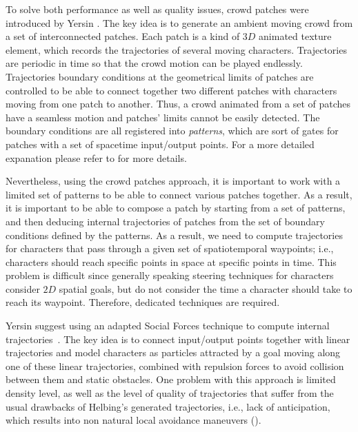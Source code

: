 To solve both performance as well as quality issues, crowd patches were introduced by Yersin \etal \cite{Yersin:2009}.
The key idea is to generate an ambient moving crowd from a set of interconnected patches.
Each patch is a kind of $3D$ animated texture element, which records the trajectories of several moving characters.
Trajectories are periodic in time so that the crowd motion can be played endlessly.
Trajectories boundary conditions at the geometrical limits of patches are controlled to be able to connect together two different patches with characters moving from one patch to another.
Thus, a crowd animated from a set of patches have a seamless motion and patches' limits cannot be easily detected.
The boundary conditions are all registered into {\it patterns}, which are sort of gates for patches with a set of spacetime input/output points.
For a more detailed expanation please refer to \cite{Yersin:2009} for more details. 

Nevertheless, using the crowd patches approach, it is important to work with a limited set of patterns to be able to connect various patches together.
As a result, it is important to be able to compose a patch by starting from a set of patterns, and then deducing internal trajectories of patches from the set of boundary conditions defined by the patterns.
As a result, we need to compute trajectories for characters that pass through a given set of spatiotemporal waypoints; i.e., characters should reach specific points in space at specific points in time.
This problem is difficult since generally speaking steering techniques for characters consider $2D$ spatial goals, but do not consider the time a character should take to reach its waypoint.
Therefore, dedicated techniques are required. 

Yersin \etal suggest using an adapted Social Forces technique to compute internal trajectories~\cite{Helbing:2005}.
The key idea is to connect input/output points together with linear trajectories and model characters as particles attracted by a goal moving along one of these linear trajectories, combined with repulsion forces to avoid collision between them and static obstacles.
One problem with this approach is limited density level, as well as the level of quality of trajectories that suffer from the usual drawbacks of Helbing's generated trajectories, i.e., lack of anticipation, which results into non natural local avoidance maneuvers (). 

